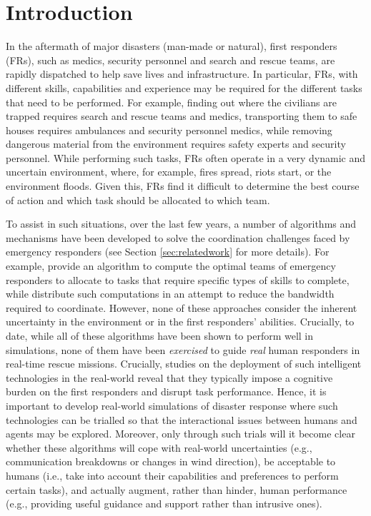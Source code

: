 \section{Introduction}
In the aftermath of major disasters (man-made or natural), first responders  (FRs), such as medics, security personnel and search and rescue teams, are  rapidly dispatched to help save lives and infrastructure. In particular, FRs, with different skills, capabilities and experience may be required for the different tasks that need to be performed.  For example, finding out where the civilians are  trapped requires search and rescue teams and medics, transporting them to safe houses  requires ambulances and security personnel medics, while  removing dangerous material from the environment requires safety experts and security personnel. While performing such tasks, FRs often operate in a very dynamic and uncertain environment, where, for example, fires  spread, riots start, or the environment floods. Given this, FRs find it difficult to determine the best course of action and which task should be allocated to which team.

To assist in such situations, over the last few years, a number of  algorithms  and mechanisms have been developed to solve the coordination challenges faced by emergency responders  (see Section \ref{sec:relatedwork} for more details). For example, \cite{ramchurn:etal:2010} provide an algorithm to compute the optimal teams of emergency responders to allocate to tasks that require specific types of skills to complete, while \cite{Chapman2009,puyol:etal:2014} distribute such computations in an attempt to reduce the bandwidth required to coordinate. However, none of these approaches consider the inherent uncertainty in the environment or in the first responders' abilities. Crucially, to date, while all of these algorithms have been shown to perform well in simulations, none of them have been \emph{exercised} to guide \emph{real} human responders in real-time rescue missions. Crucially,  studies on the deployment of such intelligent technologies in the real-world reveal that they typically impose a cognitive burden on the first responders \cite{Rachlin1997,Moran2013} and disrupt task performance.  Hence, it is important to develop real-world simulations of disaster response where such technologies can be trialled so that  the interactional issues between humans and agents may be explored. Moreover, only through such trials will it become clear whether these algorithms will cope with real-world uncertainties (e.g., communication breakdowns or changes in wind direction), be acceptable to humans (i.e., take into account their capabilities and preferences to perform certain tasks), and actually augment, rather than hinder,  human performance (e.g., providing useful guidance and support rather than intrusive ones). 


